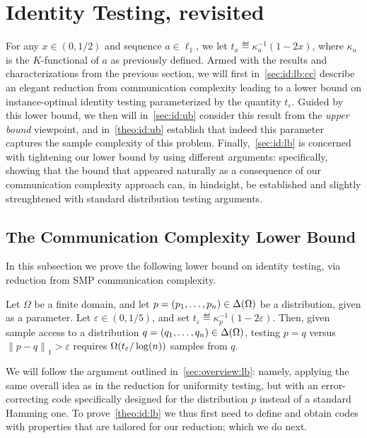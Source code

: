 \documentclass[11pt]{article}
\theoremstyle{remark}   	\newtheorem{remark}[theorem]{Remark}
\theoremstyle{definition}   	\newaliascnt{defn}{theorem}
\newcommand{\eps}{\ensuremath{\varepsilon}\xspace}
\newcommand{\bigOmega}[1]{{\Omega\mleft( #1 \mright)}}
\newcommand{\norm}[1]{\lVert#1{\rVert}}
\newcommand{\normone}[1]{{\norm{#1}}_1}
\newcommand{\lp}[1][1]{\ell_{#1}}
\newcommand{\kf}[1]{\kappa_{#1}}
\begin{document}
\section{Identity Testing, revisited}\label{sec:instanceoptimal:identity}
For any $x\in(0,1/2)$ and sequence $a\in\lp[1]$, we let $t_x \eqdef \kf{a}^{-1}(1-2x)$, where $\kf{a}$ is the $K$-functional of $a$ as previously defined. Armed with the results and characterizations from the previous section, we will first in~\autoref{sec:id:lb:cc} describe an elegant reduction from communication complexity leading to a lower bound on instance-optimal identity testing parameterized by the quantity $t_\eps$. Guided by this lower bound, we then will in~\autoref{sec:id:ub} consider this result from the \emph{upper bound} viewpoint, and in~\autoref{theo:id:ub} establish that indeed this parameter captures the sample complexity of this problem. Finally,~\autoref{sec:id:lb} is concerned with tightening our lower bound by using different arguments: specifically, showing that the bound that appeared naturally as a consequence of our communication complexity approach can, in hindsight, be established and slightly strenghtened with standard distribution testing arguments.

\subsection{The Communication Complexity Lower Bound}\label{sec:id:lb:cc}
In this subsection we prove the following lower bound on identity testing, via reduction from SMP communication complexity.

\begin{theorem}
\label{theo:id:lb}
Let $\Omega$ be a finite domain, and let $p = (p_1,\ldots, p_n) \in \Delta\!\left(\Omega\right)$ be a distribution, given as a parameter. Let $\eps\in(0,1/5)$, and set $t_\eps \eqdef \kf{p}^{-1}(1-2\eps)$. Then, given sample access to a distribution $q = (q_1,\ldots, q_n) \in \Delta\!\left(\Omega\right)$,
testing $p=q$ versus $\normone{p-q} > \eps$ requires $\bigOmega{t_\eps/\log(n)}$ samples from $q$.
\end{theorem}

We will follow the argument outlined in~\autoref{sec:overview:lb}: namely, applying the same overall idea as in the reduction for uniformity testing, but with an error-correcting code specifically designed for the distribution $p$ instead of a standard Hamming one. 
To prove~\autoref{theo:id:lb} we thus first need to define and obtain codes with properties that are tailored for our reduction; which we do next.
\end{document}
